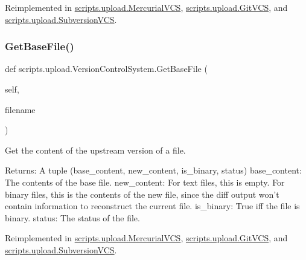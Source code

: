 Reimplemented in \mbox{\hyperlink{classscripts_1_1upload_1_1_mercurial_v_c_s_a3daf7aa68fe23bc4d062553d8e46b5e3}{scripts.\+upload.\+Mercurial\+V\+CS}}, \mbox{\hyperlink{classscripts_1_1upload_1_1_git_v_c_s_abb1b442ca3cf81472388afa047932b7c}{scripts.\+upload.\+Git\+V\+CS}}, and \mbox{\hyperlink{classscripts_1_1upload_1_1_subversion_v_c_s_a2fc2b2cf2f05b53694a28326338870e5}{scripts.\+upload.\+Subversion\+V\+CS}}.

\mbox{\label{classscripts_1_1upload_1_1_version_control_system_ae50b1c259d0f1e12e855a142c8ee04e4}} 
\subsubsection{\texorpdfstring{GetBaseFile()}{GetBaseFile()}}
{\footnotesize\ttfamily def scripts.\+upload.\+Version\+Control\+System.\+Get\+Base\+File (\begin{DoxyParamCaption}\item[{}]{self,  }\item[{}]{filename }\end{DoxyParamCaption})}

\begin{DoxyVerb}Get the content of the upstream version of a file.

Returns:
  A tuple (base_content, new_content, is_binary, status)
base_content: The contents of the base file.
new_content: For text files, this is empty.  For binary files, this is
  the contents of the new file, since the diff output won't contain
  information to reconstruct the current file.
is_binary: True iff the file is binary.
status: The status of the file.
\end{DoxyVerb}
 

Reimplemented in \mbox{\hyperlink{classscripts_1_1upload_1_1_mercurial_v_c_s_ac266a482242d3bf373da45602793f326}{scripts.\+upload.\+Mercurial\+V\+CS}}, \mbox{\hyperlink{classscripts_1_1upload_1_1_git_v_c_s_ace8b049081fca38f0794d4b17cd5f5cd}{scripts.\+upload.\+Git\+V\+CS}}, and \mbox{\hyperlink{classscripts_1_1upload_1_1_subversion_v_c_s_a8b2d91ae013cd586191a010c16bfa0b8}{scripts.\+upload.\+Subversion\+V\+CS}}.

\mbox{\label{classscripts_1_1upload_1_1_version_control_system_ac15baf4dac8cf3d88ab3bd12853f38e9}} 

